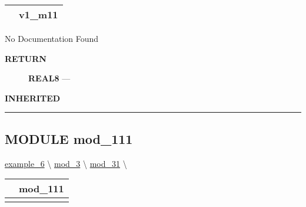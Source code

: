{\renewcommand{\arraystretch}{1.5}
\begin{tabularx}{\textwidth}{|>{\raggedright\arraybackslash}l|X|}
\hline
\hspace{0pt}\mytexttt{\color{red} } & \textbf{v1\_m11} \\
\hline
\end{tabularx}
}

\par





No Documentation Found








\par
\begin{description}
\item [\colorbox{tagtype}{\color{white} \textbf{\textsf{RETURN}}}] \textbf{REAL8} --- 
\end{description}






\par
\begin{description}
\item [\colorbox{tagtype}{\color{white} \textbf{\textsf{INHERITED}}}] 
\end{description}



\rule{\linewidth}{0.5pt}
\subsection*{\textsf{\colorbox{headtoc}{\color{white} MODULE}
mod\_111}}

\hypertarget{ecldoc:intest.in1intest.example_6.mod_1.mod_11.mod_111}{}
\hspace{0pt} \hyperlink{ecldoc:intest.in1intest.example_6}{example_6} \textbackslash 
\hspace{0pt} \hyperlink{ecldoc:intest.in1intest.example_6.mod_3}{mod_3} \textbackslash 
\hspace{0pt} \hyperlink{ecldoc:intest.in1intest.example_6.mod_3.mod_31}{mod_31} \textbackslash 

{\renewcommand{\arraystretch}{1.5}
\begin{tabularx}{\textwidth}{|>{\raggedright\arraybackslash}l|X|}
\hline
\hspace{0pt}\mytexttt{\color{red} } & \textbf{mod\_111} \\
\hline
\multicolumn{2}{|>{\raggedright\arraybackslash}X|}{\hspace{0pt}\mytexttt{\color{param} (real8 a\_111)}} \\
\hline
\end{tabularx}
}


